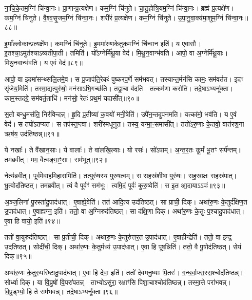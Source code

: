ना॒चि॒के॒तम॒ग्निं चि॑न्वा॒नः। 
प्रा॒णान्प्र॒त्यक्षे॑ण। कम॒ग्निं चि॑नुते। चा॒तु॒\ar{}हो॒त्रि॒य\-म॒ग्निं चि॑न्वा॒नः। 
ब्रह्म॑ प्र॒त्यक्षे॑ण। कम॒ग्निं चि॑नुते। वै॒श्व॒सृ॒जम॒ग्निं चि॑न्वा॒नः। 
शरी॑रं प्र॒त्यक्षे॑ण। कम॒ग्निं चि॑नुते। उ॒पा॒नु॒वा॒क्य॑\-मा॒शुम॒ग्निं चि॑न्वा॒नः॥८८॥


इ॒माँल्लो॒कान्प्र॒त्यक्षे॑ण। कम॒ग्निं चि॑नुते। 
इ॒ममा॑रुणकेतुकम॒ग्निं चि॑न्वा॒न इति॑। य ए॒वासौ। 
इ॒तश्चा॒ऽमुत॑श्चाऽव्यतीपा॒ती। तमिति॑। 
यो᳚ऽग्नेर्मि॑थू॒या वेद॑। मि॒थु॒न॒वान्भ॑वति। 
आपो॒ वा अ॒ग्नेर्मि॑थू॒याः। मि॒थु॒न॒वान्भ॑वति। य ए॒वं वेद॑॥८९॥\anuvakamend


आपो॒ वा इ॒दमा॑सन्थ्सलि॒लमे॒व। स प्र॒जाप॑ति॒रेकः॑ पुष्करप॒र्णे सम॑भवत्। 
तस्यान्त॒र्मन॑सि कामः॒ सम॑वर्तत। इ॒दꣳ सृ॑जेय॒मिति॑। 
तस्मा॒द्यत्पुरु॑षो॒ मन॑साऽभि॒गच्छ॑ति। तद्वा॒चा व॑दति। 
तत्कर्म॑णा करोति। तदे॒षाऽभ्यनू᳚क्ता। 
काम॒स्तदग्रे॒ सम॑वर्त॒ताधि॑। मन॑सो॒ रेतः॑ प्रथ॒मं यदासी᳚त्॥९०॥


स॒तो बन्धु॒मस॑ति॒ निर॑विन्दन्न्। हृ॒दि प्र॒तीष्या॑ क॒वयो॑ मनी॒षेति॑। 
उपै॑न॒न्तदुप॑नमति। यत्का॑मो॒ भव॑ति। य ए॒वं वेद॑। 
स तपो॑ऽतप्यत। स तप॑स्त॒प्त्वा। शरी॑रमधूनुत। तस्य॒ यन्मा॒ꣳ॒समासी᳚त्। 
ततो॑ऽरु॒णाः के॒तवो॒ वात॑रश॒ना ऋष॑य॒ उद॑तिष्ठन्न्॥९१॥


ये नखाः᳚। ते वै॑खान॒साः। ये वालाः᳚। ते वा॑लखि॒ल्याः। 
यो रसः॑। सो॑ऽपाम्। अ॒न्त॒र॒तः कू॒र्मं भू॒तꣳ सर्प॑न्तम्। 
तम॑ब्रवीत्। मम॒ वैत्वङ्मा॒ꣳ॒सा। सम॑भूत्॥९२॥


नेत्य॑ब्रवीत्। पूर्व॑मे॒वाहमि॒हास॒मिति॑। 
तत्पुरु॑षस्य पुरुष॒त्वम्। स स॒हस्र॑शी\ur{}षा॒ पुरु॑षः। 
स॒ह॒स्रा॒क्षः स॒हस्र॑पात्। भू॒त्वोद॑तिष्ठत्। 
तम॑ब्रवीत्। त्वं वै पूर्वꣳ॑ सम॑भूः। 
त्वमि॒दं पूर्वः॑ कुरु॒ष्वेति॑। स इ॒त आ॒दायाऽऽपः॑॥९३॥


अ॒ञ्ज॒लिना॑ पु॒रस्ता॑दु॒पाद॑धात्। ए॒वाह्ये॒वेति॑। 
तत॑ आदि॒त्य उद॑तिष्ठत्। सा प्राची॒ दिक्। 
अथा॑रु॒णः के॒तुर्द॑क्षिण॒त उ॒पाद॑धात्। 
ए॒वाह्यग्न॒ इति॑। ततो॒ वा अ॒ग्निरुद॑तिष्ठत्। 
सा द॑क्षि॒णा दिक्। अथा॑रु॒णः के॒तुः प॒श्चादु॒पाद॑धात्। 
ए॒वा हि वायो॒ इति॑॥९४॥


ततो॑ वा॒युरुद॑तिष्ठत्। सा प्र॒तीची॒ दिक्। 
अथा॑रु॒णः के॒तुरु॑त्तर॒त उ॒पाद॑धात्। ए॒वाहीन्द्रेति॑। 
ततो॒ वा इन्द्र॒ उद॑तिष्ठत्। सोदी॑ची॒ दिक्। 
अथा॑रु॒णः के॒तुर्मध्य॑ उ॒पाद॑धात्। ए॒वा हि पूष॒न्निति॑। 
ततो॒ वै पू॒षोद॑तिष्ठत्। सेयं दिक्॥९५॥


अथा॑रु॒णः के॒तुरु॒परि॑ष्टादु॒पाद॑धात्। ए॒वा हि देवा॒ इति॑। 
ततो॑ देवमनु॒ष्याः पि॒तरः॑। ग॒न्ध॒र्वा॒फ्स॒रस॒श्चोद॑तिष्ठन्न्। 
सोर्ध्वा दिक्। या वि॒प्रुषो॑ वि॒परा॑पतन्न्। 
ताभ्योऽसु॑रा॒ रक्षाꣳ॑सि पिशा॒चाश्चोद॑तिष्ठन्न्। तस्मा॒त्ते परा॑भवन्न्। 
वि॒प्रुड्भ्यो॒ हि ते सम॑भवन्न्। तदे॒षाऽभ्यनू᳚क्ता॥९६॥


